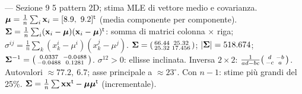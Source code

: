 \begin{appunti}{— Sezione 9}
 5 pattern 2D; stima MLE di vettore medio e covarianza.
 $\mmu=\frac1n\sum_i\x_i=[8.9,\ 9.2]\T$ (media componente per componente).
 $\bm{\Sigma}=\frac1n\sum_i(\mathbf{x}_i-\bm{\mu})(\mathbf{x}_i-\bm{\mu})^{\mathsf{t}}$: somma di matrici colonna $\times$ riga; $\sigma^{ij}=\frac1n\sum_k(x_k^i-\mu^i)(x_k^j-\mu^j)$.
 $\bm{\Sigma}=\begin{psmallmatrix}66.44&25.32\\25.32&17.456\end{psmallmatrix}$; $|\bm{\Sigma}|=518.674$; $\bm{\Sigma}^{-1}=\begin{psmallmatrix}0.0337&-0.0488\\-0.0488&0.1281\end{psmallmatrix}$. $\sigma^{12}>0$: ellisse inclinata.
 Inversa $2\times2$: $\frac1{ad-bc}\begin{psmallmatrix}d&-b\\-c&a\end{psmallmatrix}$.
 Autovalori $\approx77.2,\ 6.7$; asse principale a $\approx23^\circ$. Con $n-1$: stime più grandi del 25\%. $\bm{\Sigma}=\frac1n\sum\mathbf{x}\mathbf{x}^{\mathsf{t}}-\bm{\mu}\bm{\mu}^{\mathsf{t}}$ (incrementale).
\end{appunti}
